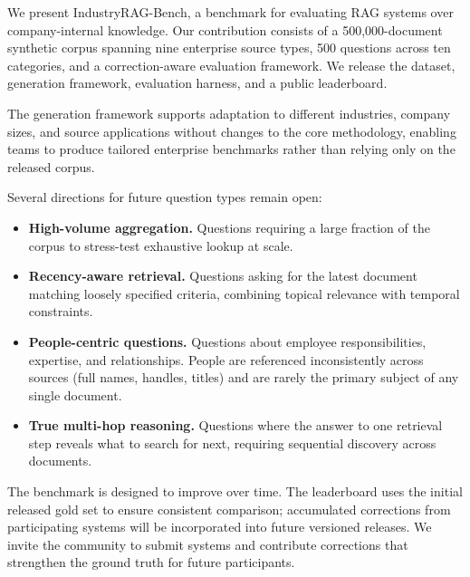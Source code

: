 \documentclass{article}
\begin{document}
We present IndustryRAG-Bench, a benchmark for evaluating RAG systems over company-internal knowledge. Our contribution consists of a 500,000-document synthetic corpus spanning nine enterprise source types, 500 questions across ten categories, and a correction-aware evaluation framework. We release the dataset, generation framework, evaluation harness, and a public leaderboard.

The generation framework supports adaptation to different industries, company sizes, and source applications without changes to the core methodology, enabling teams to produce tailored enterprise benchmarks rather than relying only on the released corpus.

Several directions for future question types remain open:

\begin{itemize}[leftmargin=2em]
  \item \textbf{High-volume aggregation.} Questions requiring a large fraction of the corpus to stress-test exhaustive lookup at scale.
  \item \textbf{Recency-aware retrieval.} Questions asking for the latest document matching loosely specified criteria, combining topical relevance with temporal constraints.
  \item \textbf{People-centric questions.} Questions about employee responsibilities, expertise, and relationships. People are referenced inconsistently across sources (full names, handles, titles) and are rarely the primary subject of any single document.
  \item \textbf{True multi-hop reasoning.} Questions where the answer to one retrieval step reveals what to search for next, requiring sequential discovery across documents.
\end{itemize}

The benchmark is designed to improve over time. The leaderboard uses the initial released gold set to ensure consistent comparison; accumulated corrections from participating systems will be incorporated into future versioned releases. We invite the community to submit systems and contribute corrections that strengthen the ground truth for future participants.




\newpage
\appendix
\end{document}
